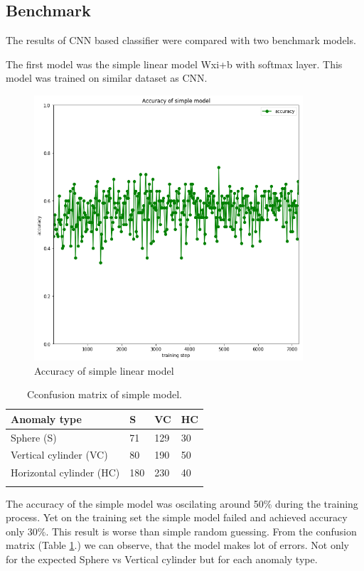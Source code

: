 \documentclass{article}
\begin{document}
\subsection{Benchmark}\label{benchmark}

The results of CNN based classifier were compared with two benchmark
models.

The first model was the simple linear model Wxi+b with softmax layer.
This model was trained on similar dataset as CNN.



\begin{figure}[!htp]
\centerline{\includegraphics[width=10cm]{img/simple_model_accuracy.png}}
\renewcommand{\figurename}{Figure}
\caption[Accuracy of simple linear model]{Accuracy of simple linear model}
\label{fig:SimpleModelAccuracy}
\end{figure}


\begin{longtable}[c]{@{}llll@{}}
\toprule
Anomaly type & S & VC & HC\tabularnewline
\midrule
\endhead
Sphere (S) & 71 & 129 & 30\tabularnewline
Vertical cylinder (VC) & 80 & 190 & 50\tabularnewline
Horizontal cylinder (HC) & 180 & 230 & 40\tabularnewline
\bottomrule
\caption[Confusion matrix of simple model]{Cconfusion matrix of simple model.}
\label{tab:ConfusionMatrixSimpleModel}
\end{longtable}

The accuracy of the simple model was oscilating around 50\% during the training
process. Yet on the training set the simple model failed and achieved accuracy
only 30\%. This result is worse than simple random guessing.  From the
confusion matrix (Table \ref{tab:ConfusionMatrixSimpleModel}.) we can observe, that the
model makes lot of errors.  Not only for the expected Sphere vs Vertical
cylinder but for each anomaly type.
\end{document}
